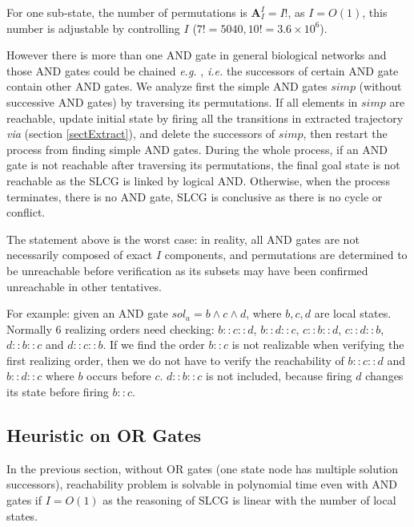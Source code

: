 \documentclass[runningheads]{llncs}
\begin{document}
For one sub-state, the number of permutations is $\mathbf{A}_I^I=I!$, as $I=O (1)$, this number is adjustable by controlling $I$ ($7!=5040,10!=3.6\times 10^6$).

However there is more than one AND gate in general biological networks and those AND gates could be chained \textit{e.g.} \cite{samaga2009logic}, \textit{i.e.} the successors of certain AND gate contain other AND gates.
We analyze first the simple AND gates $simp$ (without successive AND gates) by traversing its permutations.
If all elements in $simp$ are reachable, update initial state by firing all the transitions in extracted trajectory \textit{via} (section \ref{sectExtract}), and delete the successors of $simp$, then restart the process from finding simple AND gates.
During the whole process, if an AND gate is not reachable after traversing its permutations, the final goal state is not reachable as the SLCG is linked by logical AND. 
Otherwise, when the process terminates, there is no AND gate, SLCG is conclusive as there is no cycle or conflict.

The statement above is the worst case: in reality, all AND gates are not necessarily composed of exact $I$ components, and permutations are determined to be unreachable before verification as its subsets may have been confirmed unreachable in other tentatives.

For example: given an AND gate $sol_a=b\land c\land d$, where $b,c,d$ are local states.
Normally 6 realizing orders need checking: $b::c::d$, $b::d::c$, $c::b::d$, $c::d::b$, $d::b::c$ and $d::c::b$. 
If we find the order $b::c$ is not realizable when verifying the first realizing order, then we do not have to verify the reachability of $b::c::d$ and $b::d::c$ where $b$ occurs before $c$. $d::b::c$ is not included, because firing $d$ changes its state before firing $b::c$.



\subsection{Heuristic on OR Gates}\label{sectheuristic}
In the previous section, without OR gates (one state node has multiple solution successors), reachability problem is solvable in polynomial time even with AND gates if $I=O (1)$ as the reasoning of SLCG is linear with the number of local states.
\end{document}
